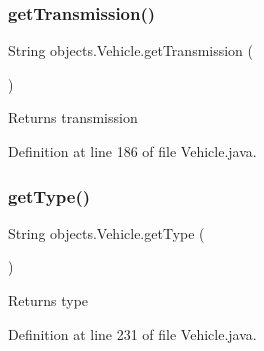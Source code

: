 \begin{DoxyCode}{0}

\end{DoxyCode}
\mbox{\label{classobjects_1_1_vehicle_a549e7e76185dc23d9c818287bcad3384}} 
\subsubsection{\texorpdfstring{getTransmission()}{getTransmission()}}
{\footnotesize\ttfamily String objects.\+Vehicle.\+get\+Transmission (\begin{DoxyParamCaption}{ }\end{DoxyParamCaption})}

\begin{DoxyReturn}{Returns}
transmission 
\end{DoxyReturn}


Definition at line 186 of file Vehicle.\+java.


\begin{DoxyCode}{0}

\end{DoxyCode}
\mbox{\label{classobjects_1_1_vehicle_aced89dd649b4c83ad6932339c7ac3d3c}} 
\subsubsection{\texorpdfstring{getType()}{getType()}}
{\footnotesize\ttfamily String objects.\+Vehicle.\+get\+Type (\begin{DoxyParamCaption}{ }\end{DoxyParamCaption})}

\begin{DoxyReturn}{Returns}
type 
\end{DoxyReturn}


Definition at line 231 of file Vehicle.\+java.


